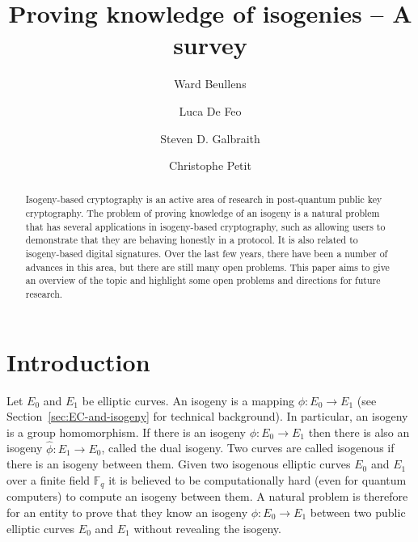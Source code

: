 \documentclass{llncs}
\newcommand{\F}{\ensuremath{\mathbb{F}}}
\begin{document}
\pagestyle{plain}

\title{Proving knowledge of isogenies -- A survey}


\author{Ward Beullens \and Luca De Feo \and Steven D. Galbraith \and Christophe Petit}


\maketitle


\begin{abstract}
Isogeny-based cryptography is an active area of research in post-quantum public key cryptography.
The problem of proving knowledge of an isogeny is a natural problem that has several applications in isogeny-based cryptography, such as allowing users to demonstrate that they are behaving honestly in a protocol.
It is also related to isogeny-based digital signatures.
Over the last few years, there have been a number of advances in this area, but there are still many open problems.
This paper aims to give an overview of the topic and highlight some open problems and directions for future research.
\end{abstract}



\section{Introduction}\label{sec1}


Let $E_0$ and $E_1$ be elliptic curves.
An isogeny is a mapping $\phi : E_0 \to E_1$  (see Section~\ref{sec:EC-and-isogeny} for technical background). In particular, an isogeny is a group homomorphism.
If there is an isogeny $\phi : E_0 \to E_1$ then there is also an isogeny $\hat{\phi} : E_1 \to E_0$, called the dual isogeny.
Two curves are called isogenous if there is an isogeny between them.
Given two isogenous elliptic curves $E_0$ and $E_1$ over a finite field $\F_q$ it is believed to be computationally hard (even for quantum computers) to compute an isogeny between them.
A natural problem is therefore for an entity to prove that they know an isogeny $\phi : E_0 \to E_1$ between two public elliptic curves $E_0$ and $E_1$ without revealing the isogeny.
\end{document}
